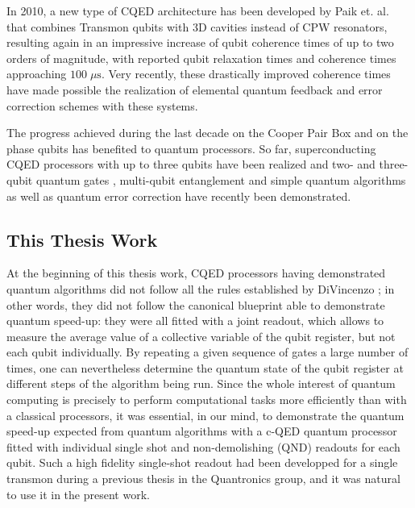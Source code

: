 In 2010, a new type of CQED architecture has been
developed by Paik et. al. \citep{paik_observation_2011} that combines Transmon
qubits with 3D cavities instead of CPW resonators, resulting again
in an impressive increase of qubit coherence times of up to two orders
of magnitude, with reported qubit relaxation times
and coherence times approaching $100\;\mu\mathrm{s}$.
Very recently, these drastically improved coherence times have made
possible the realization of elemental quantum feedback and error correction
schemes with these systems\citep{vijay_quantum_2012}.

\smallskip

The progress achieved during the last decade on the
Cooper Pair Box and on the phase qubits has benefited to quantum processors.
So far, superconducting CQED processors with up to three qubits have
been realized and two- and three-qubit quantum gates \citep{fedorov_implementation_2011},
multi-qubit entanglement \citep{dicarlo_preparation_2010} and simple
quantum algorithms \citep{dicarlo_demonstration_2009} as well as
quantum error correction  \citep{reed_realization_2011} have recently
been demonstrated.

\subsection{This Thesis Work}

At the beginning of this thesis work, CQED processors
having demonstrated quantum algorithms did not follow all the rules
established by DiVincenzo \citep{divincenzo_physical_2000}; in other words, they
did not follow the canonical blueprint able to demonstrate quantum
speed-up: they were all fitted with a joint readout, which allows
to measure the average value of a collective variable of the qubit
register, but not each qubit individually. By repeating a given sequence
of gates a large number of times, one can nevertheless determine the
quantum state of the qubit register at different steps of the algorithm
being run. Since the whole interest of quantum computing is precisely
to perform computational tasks more efficiently than with a classical
processors, it was essential, in our mind, to demonstrate the quantum
speed-up expected from quantum algorithms with a c-QED quantum processor
fitted with individual single shot and non-demolishing (QND) readouts
for each qubit. Such a high fidelity single-shot readout had been
developped for a single transmon during a previous thesis in the Quantronics
group\citep{mallet_single-shot_2009,palacios-laloy_superconducting_2010}, and it was natural to use it in the present work.


